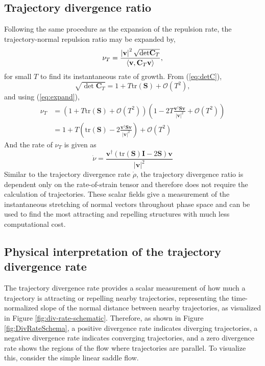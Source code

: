 \documentclass[twocolumn]{svjour3}
\newcommand{\edit}[3]{{\color{red} #2}}
\begin{document}
\subsection{Trajectory divergence ratio}
Following the same procedure as the expansion of the repulsion rate, the trajectory-normal repulsion ratio may be expanded by,
\begin{equation}
\nu_T  
= \frac{
\left| \mathbf{v} \right|^2 \sqrt{{\rm det} \mathbf{C}_T  }}{
\langle \mathbf{v} ,\mathbf{C}_T   \mathbf{v}  \rangle
},
\label{eq:nuT}
\end{equation}
for small \(T\) to find its instantaneous rate of growth. From (\ref{eq:detC}),
\begin{equation}
\sqrt{\det \mathbf{C}_T } = 1 + T\text{tr}(\mathbf{S} )+\mathcal{O}(T^2),
\end{equation}
and using (\ref{eq:expand}),
\begin{equation}
\begin{aligned}
\nu_T  & = \left(1 + T\text{tr}(\mathbf{S} )+\mathcal{O}(T^2)\right)\left(1-2T \frac{\mathbf{v} ^\dagger \mathbf{S} \mathbf{v} }{\left|\mathbf{v} \right|^2}+\mathcal{O}(T^2)\right) \\
& = 1 + T\left(\text{tr}(\mathbf{S} )-2\frac{\mathbf{v} ^\dagger \mathbf{S} \mathbf{v} }{\left|\mathbf{v} \right|^2}\right)+\mathcal{O}(T^2)
\end{aligned}
\end{equation}
And the rate of \(\nu_T\) is given as 
\begin{equation}
\dot{\nu} = \frac{\mathbf{v}^\dagger\left(\text{tr}(\mathbf{S})\mathbf{I}-2 \mathbf{S}\right)\mathbf{v}}{\left|\mathbf{v}\right|^2}
\end{equation}
Similar to the trajectory divergence rate $\dot{\rho}$, the \edit{}{trajectory}{14} divergence \edit{rate}{ratio}{14} is dependent only on the rate-of-strain tensor and therefore does not require the calculation of trajectories. These scalar fields give a measurement of the instantaneous stretching of normal vectors throughout phase space and can be used to find the most attracting and repelling structures with much less computational cost.

\subsection{Physical interpretation of the trajectory divergence rate}
The trajectory divergence rate provides a scalar measurement of how much a trajectory is attracting or repelling nearby trajectories, representing the time-normalized slope of the normal distance between nearby trajectories, as visualized in Figure \ref{fig:div-rate-schematic}. Therefore, as shown in Figure \ref{fig:DivRateSchema}, a positive divergence rate indicates diverging trajectories, a negative divergence rate indicates converging trajectories, and a zero divergence rate shows the regions of the flow where trajectories are parallel.	To visualize this, consider the simple linear saddle flow.
\end{document}
